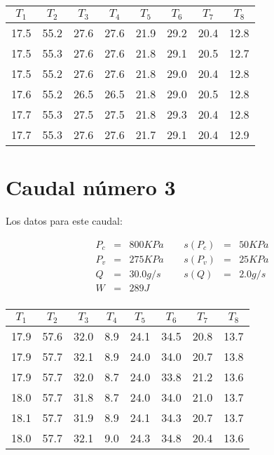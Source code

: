 \documentclass[12pt,a4paper]{article}
\begin{document}
\begin{table}[h!] 	 \centering 
\begin{tabular}{|c|c|c|c|c|c|c|c|} 
\hline 
$T_1$ & $T_2$ & $T_3$ & $T_4$ & $T_5$ & $T_6$ & $T_7$ & $T_8$ \\ \hline 
17.5 & 55.2 & 27.6 & 27.6 & 21.9 & 29.2 & 20.4 & 12.8  \\  
17.5 & 55.3 & 27.6 & 27.6 & 21.8 & 29.1 & 20.5 & 12.7  \\  
17.5 & 55.2 & 27.6 & 27.6 & 21.8 & 29.0 & 20.4 & 12.8  \\  
17.6 & 55.2 & 26.5 & 26.5 & 21.8 & 29.0 & 20.5 & 12.8  \\  
17.7 & 55.3 & 27.5 & 27.5 & 21.8 & 29.3 & 20.4 & 12.8  \\  
17.7 & 55.3 & 27.6 & 27.6 & 21.7 & 29.1 & 20.4 & 12.9  \\  
\hline 
\end{tabular} 
\label{tab:regresion2} 
\end{table} 
 
 
\section{Caudal número 3} 
 
Los datos para este caudal:  
 
\begin{equation} 
\begin{array}{lllllll}
P_c & = & 800 KPa &  \ \ &  s(P_c) & =  & 50  KPa \\ 
 P_v & = & 275 KPa &  \ \ &  s(P_v) & =  & 25  KPa\\ 
 Q & = & 30.0 g/s &  \ \ &  s(Q) & =  & 2.0  g/s \\ 
 W & = & 289 J & & & & \\ 
\end{array} 
\end{equation} 
 
\begin{table}[h!] 	 \centering 
\begin{tabular}{|c|c|c|c|c|c|c|c|} 
\hline 
$T_1$ & $T_2$ & $T_3$ & $T_4$ & $T_5$ & $T_6$ & $T_7$ & $T_8$ \\ \hline 
17.9 & 57.6 & 32.0 & 8.9 & 24.1 & 34.5 & 20.8 & 13.7  \\  
17.9 & 57.7 & 32.1 & 8.9 & 24.0 & 34.0 & 20.7 & 13.8  \\  
17.9 & 57.7 & 32.0 & 8.7 & 24.0 & 33.8 & 21.2 & 13.6  \\  
18.0 & 57.7 & 31.8 & 8.7 & 24.0 & 34.0 & 21.0 & 13.7  \\  
18.1 & 57.7 & 31.9 & 8.9 & 24.1 & 34.3 & 20.7 & 13.7  \\  
18.0 & 57.7 & 32.1 & 9.0 & 24.3 & 34.8 & 20.4 & 13.6  \\  
\hline 
\end{tabular} 
\label{tab:regresion3} 
\end{table} 
 
\end{document}
